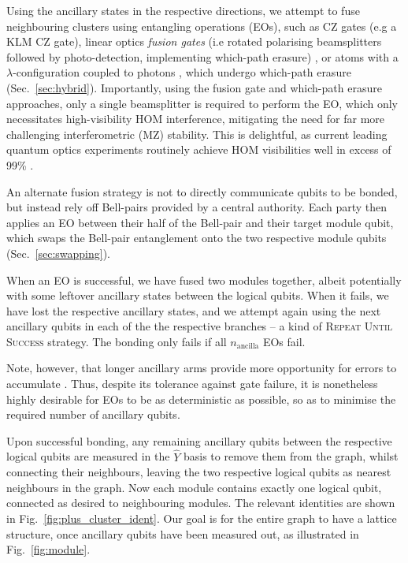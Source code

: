 \documentclass[aps,rmp,twocolumn,amsmath,amssymb,nofootinbib,superscriptaddress,longbibliography,floatfix,table-of-contents,eqsecnum]{revtex4-1}
\begin{document}
Using the ancillary states in the respective directions, we attempt to fuse neighbouring clusters using entangling operations (EOs), such as CZ gates (e.g a KLM CZ gate), linear optics \textit{fusion gates} (i.e rotated polarising beamsplitters followed by photo-detection, implementing which-path erasure) \cite{bib:BrowneRudolph05}, or atoms with a $\lambda$-configuration coupled to photons \cite{bib:BarrettKok05}, which undergo which-path erasure (Sec.~\ref{sec:hybrid}). Importantly, using the fusion gate and which-path erasure approaches, only a single beamsplitter is required to perform the EO, which only necessitates high-visibility HOM interference, mitigating the need for far more challenging interferometric (MZ) stability. This is delightful, as current leading quantum optics experiments routinely achieve HOM visibilities well in excess of 99\% \cite{???}.

An alternate fusion strategy is not to directly communicate qubits to be bonded, but instead rely off Bell-pairs provided by a central authority. Each party then applies an EO between their half of the Bell-pair and their target module qubit, which swaps the Bell-pair entanglement onto the two respective module qubits (Sec.~\ref{sec:swapping}).

When an EO is successful, we have fused two modules together, albeit potentially with some leftover ancillary states between the logical qubits. When it fails, we have lost the respective ancillary states, and we attempt again using the next ancillary qubits in each of the the respective branches -- a kind of \textsc{Repeat Until Success} strategy. The bonding only fails if all $n_\text{ancilla}$ EOs fail.

Note, however, that longer ancillary arms provide more opportunity for errors to accumulate \cite{bib:RohdeRalphMunro07}. Thus, despite its tolerance against gate failure, it is nonetheless highly desirable for EOs to be as deterministic as possible, so as to minimise the required number of ancillary qubits.

Upon successful bonding, any remaining ancillary qubits between the respective logical qubits are measured in the $\hat{Y}$ basis to remove them from the graph, whilst connecting their neighbours, leaving the two respective logical qubits as nearest neighbours in the graph. Now each module contains exactly one logical qubit, connected as desired to neighbouring modules. The relevant identities are shown in Fig.~\ref{fig:plus_cluster_ident}. Our goal is for the entire graph to have a lattice structure, once ancillary qubits have been measured out, as illustrated in Fig.~\ref{fig:module}.
\end{document}
